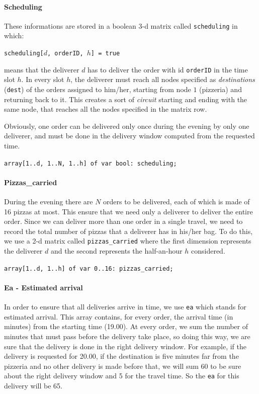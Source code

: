 \documentclass[10pt]{article}
\begin{document}
    \paragraph*{Scheduling}
	These informations are stored in a boolean 3-d matrix called 
	\texttt{scheduling} in which: 
	
	\begin{center}
		\texttt{scheduling[$d$, orderID, $h$] = true}
	\end{center}
	
	means that the deliverer $d$ has to deliver the order with id 
	\texttt{orderID} in the time slot $h$. In every slot $h$, the deliverer must 
	reach all nodes specified as \textit{destinations} (\texttt{dest}) of the orders assigned to 
	him/her, starting from node $1$ (pizzeria) and returning back to it. This creates
	 a sort of \textit{circuit} starting and ending with the same node, that reaches all the 
	nodes specified in the matrix row.

	Obviously, one order can be delivered only once during the evening by only
	one deliverer, and must be done in the delivery window computed from the requested time.

	\begin{center}
		\texttt{array[1..d, 1..N, 1..h] of var bool: scheduling;}
	\end{center}

	\paragraph*{Pizzas\_carried}
	During the evening there are $N$ orders to be delivered, each of which is made of
	16 pizzas at most. This ensure that we need only a deliverer to deliver the 
	entire order.
	Since we can deliver more than one order in a single travel, we need to
	record the total number of pizzas that a deliverer has in his/her bag.
	To do this, we use a 2-d matrix called \texttt{pizzas\_carried} where
	the first dimension represents the deliverer $d$ and the second 
	represents the half-an-hour $h$ considered.


	\begin{center}
		\texttt{array[1..d, 1..h] of var 0..16: pizzas\_carried;}
	\end{center}

	\paragraph*{Ea - Estimated arrival}
	In order to ensure that all deliveries arrive in time, we use \texttt{ea} which
	stands for estimated arrival. This array contains, for every order, the arrival 
	time (in minutes) from the starting time (19.00). At every order, we sum the number 
	of minutes that must pass before the delivery take place, so doing this way,
	we are sure that the delivery is done in the right delivery window.
	For example, if the delivery is requested for 20.00, if the destination is five minutes 
	far from the pizzeria and no other delivery is made before that, we will sum 60 to 
	be sure about the right delivery window and 5 for the travel time. So the \texttt{ea}
	for this delivery will be 65.
	
\end{document}
